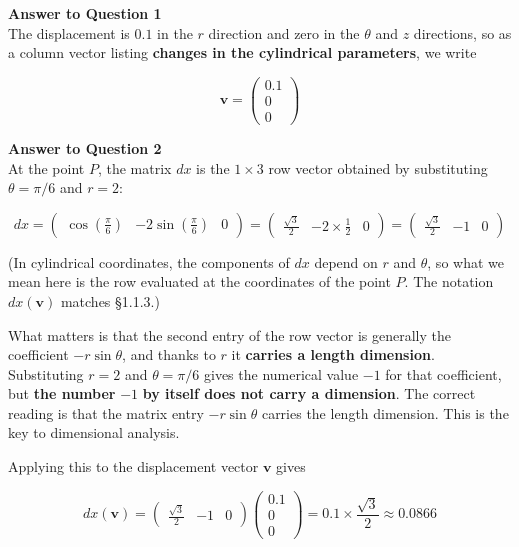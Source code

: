 \documentclass[a4paper,12pt,openany]{book}
\begin{document}
\textbf{Answer to Question 1}\\
The displacement is \(0.1\) in the \(r\) direction and zero in the
\(\theta\) and \(z\) directions, so as a column vector listing
\textbf{changes in the cylindrical parameters}, we write

\[
\mathbf{v} = \begin{pmatrix} 0.1 \\ 0 \\ 0 \end{pmatrix}
\]

\textbf{Answer to Question 2}\\
At the point \(P\), the matrix \(dx\) is the \(1\times 3\) row vector
obtained by substituting \(\theta=\pi/6\) and \(r=2\):

\[
dx
=
\begin{pmatrix}
\cos(\frac{\pi}{6}) & -2\sin(\frac{\pi}{6}) & 0
\end{pmatrix}
=
\begin{pmatrix}
\frac{\sqrt{3}}{2} & -2 \times \frac{1}{2} & 0
\end{pmatrix}
=
\begin{pmatrix}
\frac{\sqrt{3}}{2} & -1 & 0
\end{pmatrix}
\]

(In cylindrical coordinates, the components of \(dx\) depend on \(r\)
and \(\theta\), so what we mean here is the row evaluated at the
coordinates of the point \(P\). The notation \(dx(\mathbf{v})\) matches
§1.1.3.)

What matters is that the second entry of the row vector is generally the
coefficient \(-r\sin\theta\), and thanks to \(r\) it \textbf{carries a
length dimension}. Substituting \(r=2\) and \(\theta=\pi/6\) gives the
numerical value \(-1\) for that coefficient, but \textbf{the number}
\(-1\) \textbf{by itself does not carry a dimension}. The correct
reading is that the matrix entry \(-r\sin\theta\) carries the length
dimension. This is the key to dimensional analysis.

Applying this to the displacement vector \(\mathbf{v}\) gives

\[
dx(\mathbf{v})
=
\begin{pmatrix}
\frac{\sqrt{3}}{2} & -1 & 0
\end{pmatrix}
\begin{pmatrix}
0.1\\
0\\
0
\end{pmatrix}
=
0.1 \times \frac{\sqrt{3}}{2}
\approx 0.0866
\]
\end{document}
